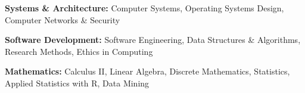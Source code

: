 
\textbf{Systems \& Architecture:} Computer Systems, Operating Systems Design, Computer Networks \& Security

\textbf{Software Development:} Software Engineering, Data Structures \& Algorithms, Research Methods, Ethics in Computing

\textbf{Mathematics:} Calculus II, Linear Algebra, Discrete Mathematics, Statistics, Applied Statistics with R, Data Mining 